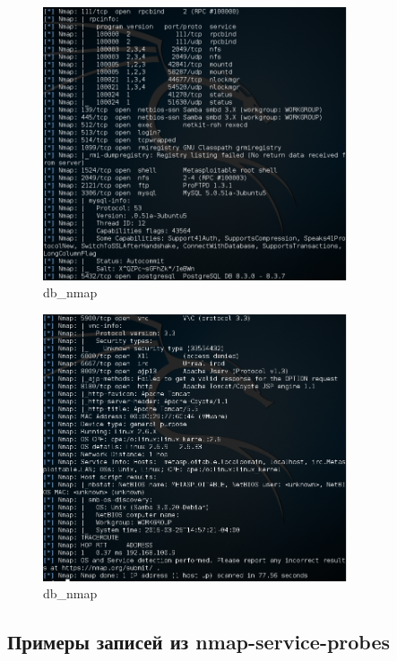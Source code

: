 \documentclass[10pt,a4paper]{article}
\begin{document}
\begin{figure}[h]
\begin{center}
\includegraphics[width=0.8\textwidth]{db_nmap_2}
\caption{db\_nmap}
\label{fig:db_nmap_2}
\end{center}
\end{figure}

\begin{figure}[h]
\begin{center}
\includegraphics[width=0.8\textwidth]{db_nmap_3}
\caption{db\_nmap}
\label{fig:db_nmap_3}
\end{center}
\end{figure}

\subsection{Примеры записей из nmap-service-probes}
\label{probes_example}
\end{document}
